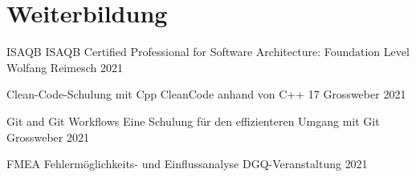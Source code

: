 
\section{Weiterbildung}
\begin{cvhonors}

\cvhonor
{ISAQB} %
{ISAQB Certified Professional for
Software Architecture: Foundation Level} %
{Wolfang Reimesch} %
{2021} %


\cvhonor
{Clean-Code-Schulung mit Cpp} %
{CleanCode anhand von C++ 17} %
{Grossweber} %
{2021} %

\cvhonor
{Git and Git Workflows} %
{Eine Schulung für den effizienteren Umgang mit Git} %
{Grossweber} %
{2021} %

\cvhonor
{FMEA} %
{Fehlermöglichkeits- und Einflussanalyse} %
{DGQ-Veranstaltung} %
{2021} %

\end{cvhonors}